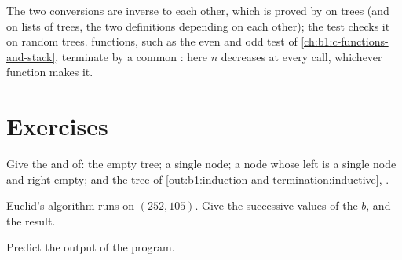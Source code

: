 The two conversions are inverse to each other, which is proved by  on trees (and on lists of
trees, the two definitions depending on each other); the test checks it on random trees.  functions,
such as the even and odd test of \cref{ch:b1:c-functions-and-stack}, terminate by a common : here $n$ decreases
at every call, whichever function makes it.

\label{lst:b1:induction-and-termination:even-odd}

\label{out:b1:induction-and-termination:even-odd}

\section{Exercises}\label{sec:b1:induction-and-termination:exercises}

\begin{exercise}[$\star$]\label{exo:b1:induction-and-termination:1}
Give the  and  of: the empty tree; a single node; a node whose left  is a single node and right
 empty; and the tree  of \cref{out:b1:induction-and-termination:inductive}, .
\end{exercise}

\begin{exercise}[$\star$]\label{exo:b1:induction-and-termination:2}
Euclid's algorithm runs on $(252, 105)$. Give the successive values of the  $b$, and the result.
\end{exercise}

\begin{exercise}[$\star$]\label{exo:b1:induction-and-termination:3}
Predict the output of the program.
\end{exercise}

